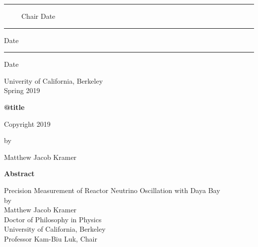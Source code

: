 \documentclass[11pt,oneside]{memoir}
\def\mylarge{\large}            %
\begin{document}
{\begin{minipage}{0.85\linewidth}
\begin{center}
    \vspace{3.5\baselineskip}
    \hrule\vspace{0.25\baselineskip}
    {\small\ \ \ \ \ Chair \hfill Date}
    \vspace{3\baselineskip}
    \hrule\vspace{0.25\baselineskip}
    {\small\hfill Date}
    \vspace{3\baselineskip}
    \hrule\vspace{0.25\baselineskip}
    {\small\hfill Date}
    \vspace{2.5\baselineskip}   %

    Univerity of California, Berkeley\\
    \vspace{1.5\baselineskip}
    Spring 2019
  \end{center}
\end{minipage}

\clearpage
\thispagestyle{empty}

\begin{center}
  \SingleSpacing
  \textbf{\csname @title\endcsname}

  \vspace{5\baselineskip}
  Copyright 2019
  \par\vspace{\baselineskip} by
  \par\vspace{\baselineskip} Matthew Jacob Kramer
\end{center}

\clearpage
} %

\thispagestyle{empty}
\DoubleSpacing

\begin{center}
  \mylarge
  \textbf{Abstract}

  \vspace{1.5\baselineskip}
  Precision Measurement of Reactor Neutrino Oscillation with Daya Bay\\
  \vspace{\baselineskip} by\\
  \vspace{\baselineskip} Matthew Jacob Kramer\\
  Doctor of Philosophy in Physics\\
  University of California, Berkeley\\
  Professor Kam-Biu Luk, Chair
  \vspace{\baselineskip}
\end{center}
\end{document}
